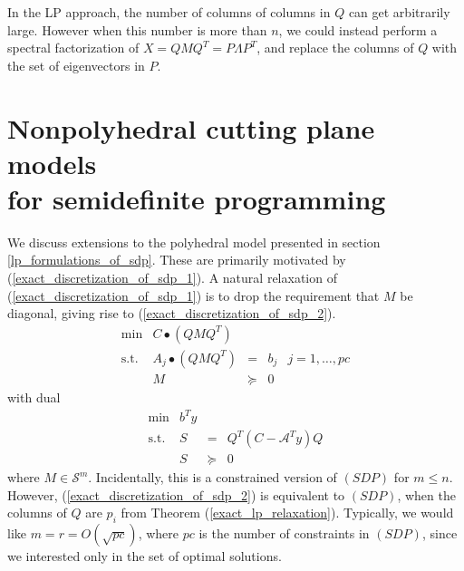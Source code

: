 \documentclass[12pt]{kluwer}
\begin{document}
\begin{article}
In the LP approach, the number of columns of columns in $Q$ can get arbitrarily large.
However when this number is more than $n$, we could instead perform
a spectral factorization of $X = QMQ^T = P \Lambda P^T$, and replace the columns of $Q$
with the set of eigenvectors in $P$.

\section{Nonpolyhedral cutting plane models \\ for semidefinite programming}

\label{nlp_formulations_of_sdp}
We discuss extensions to the polyhedral model presented in section \ref{lp_formulations_of_sdp}.
These are primarily motivated by (\ref{exact_discretization_of_sdp_1}). A natural relaxation of
(\ref{exact_discretization_of_sdp_1}) is to drop
the requirement that $M$ be diagonal, giving rise to (\ref{exact_discretization_of_sdp_2}).
\begin{equation}
\label{exact_discretization_of_sdp_2}
\begin{array}{lrccc}
\min & C \bullet (QMQ^T) \\
\mbox{s.t.} & A_j \bullet (QMQ^T) & = & b_j & j=1,\ldots,pc \\
& M & \succeq & 0
\end{array}
\end{equation}
with dual
\begin{equation}
\label{exact_discretization_of_sdd_2}
\begin{array}{lrcc}
\min & b^Ty \\
\mbox{s.t.} & S & = & Q^T(C-\mathcal{A}^Ty)Q \\
& S & \succeq & 0
\end{array}
\end{equation}
where $M \in \mathcal{S}^m$. Incidentally, this is a constrained version of $(SDP)$ for
$m \le n$. However, (\ref{exact_discretization_of_sdp_2}) is equivalent to $(SDP)$,
when the columns of $Q$ are $p_i$ from Theorem (\ref{exact_lp_relaxation}).
Typically, we would like $m = r = O(\sqrt{pc})$, where $pc$ is the number of constraints
in $(SDP)$, since we interested only in the set of optimal solutions.


\end{article}
\end{document}
